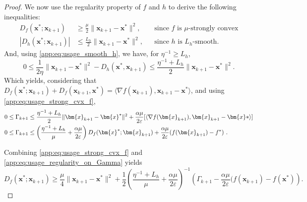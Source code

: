 \documentclass{article}
\def\eps{{\varepsilon}}
\def\vx{{\bm{x}}}
\theoremstyle{plain}
\theoremstyle{definition}
\theoremstyle{remark}
\begin{document}
\begin{proof}
    
    We now use the regularity property of $f$ and $h$ to derive the following inequalities: 
    \begin{align}
        D_{f}(\vx^*;\vx_{k+1}) &\ge \frac{\mu}{2}\|\vx_{k+1}-\vx^*\|^2, &&\text{since $f$ is $\mu$-strongly convex}\label{app:eq:usage_strong_cvx_f}\\
        |D_{h}(\vx^*;\vx_{k+1})| &\le \frac{L_h}{2}\|\vx_{k+1}-\vx^*\|^2,&&\text{since $h$ is $L_h$-smooth. }\label{app:eq:usage_smooth_h}
    \end{align}
    And, using \cref{app:eq:usage_smooth_h}, we have, for $\eta^{-1} \ge L_h$,
    \[
    0 \le \frac{1}{2\eta}\|\vx_{k+1} - \vx^*\|^2 - D_h(\vx^*,\vx_{k+1}) \le \frac{\eta^{-1} + L_h}{2}\|\vx_{k+1} - \vx^*\|^2.
    \]
    Which yields, considering that $D_f(\vx^*;\vx_{k+1}) + D_f(\vx_{k+1},\vx^*)=\langle \nabla f(\vx_{k+1}), \vx_{k+1}-\vx^*\rangle$, and using \cref{app:eq:usage_strong_cvx_f},
    \begin{align}
        0 \le \Gamma_{k+1} &\le \frac{\eta^{-1} + L_h}{2}\|\vx_{k+1} - \vx^*\|^2 + \frac{\alpha \mu}{2 \eps}[\langle \nabla f(\vx_{k+1}), \vx_{k+1}-\vx*\rangle]\notag\\
        0 \le \Gamma_{k+1}&\le \left(\frac{\eta^{-1} + L_h}{\mu} + \frac{\alpha \mu}{2 \eps}\right) D_f(\vx^*;\vx_{k+1}) + \frac{\alpha \mu}{2 \eps}(f(\vx_{k+1}) - f^*)\label{app:eq:usage_regularity_on_Gamma} \ .
    \end{align}
    
Combining \cref{app:eq:usage_strong_cvx_f} and \cref{app:eq:usage_regularity_on_Gamma} yields
\begin{equation}
\label{app:eq:lowerbound_Df}
D_f(\vx^*;\vx_{k+1}) \ge  \frac{\mu}{4}\|\vx_{k+1}-\vx^*\|^2 +\frac{1}{2}\left(\frac{\eta^{-1} + L_h}{\mu} + \frac{\alpha \mu}{2 \eps}\right)^{-1}  \left(\Gamma_{k+1} - \frac{\alpha \mu}{2 \eps} (f(\vx_{k+1})-f(\vx^*)\right).
\end{equation}


\end{proof}
\end{document}
